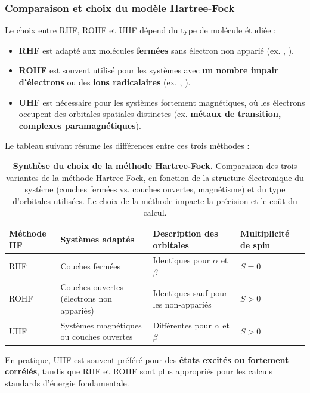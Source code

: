 \documentclass[12pt,a4paper]{article} %
\numberwithin{equation}{section} %
\numberwithin{figure}{section} %
\numberwithin{table}{section} %
\begin{document}
\subsubsection{Comparaison et choix du modèle Hartree-Fock}

Le choix entre RHF, ROHF et UHF dépend du type de molécule étudiée :
\begin{itemize}
    \item \textbf{RHF} est adapté aux molécules \textbf{fermées} sans électron non apparié (ex. , ).

    \item \textbf{ROHF} est souvent utilisé pour les systèmes avec \textbf{un nombre impair d’électrons} ou des \textbf{ions radicalaires} (ex. , ).

    \item \textbf{UHF} est nécessaire pour les systèmes fortement magnétiques, où les électrons occupent des orbitales spatiales distinctes (ex. \textbf{métaux de transition, complexes paramagnétiques}).
\end{itemize}

Le tableau suivant résume les différences entre ces trois méthodes :

\begin{table}[h!]
    \centering
    \begin{tabular}{|p{}|p{5cm}|p{5cm}|p{}|}
        \hline
        \textbf{Méthode HF} & \textbf{Systèmes adaptés} & \textbf{Description des orbitales} & \textbf{Multiplicité de spin} \\
        \hline
        RHF  & Couches fermées & Identiques pour $\alpha$ et $\beta$ & $S=0$ \\
        \hline
        ROHF & Couches ouvertes (électrons non appariés) & Identiques sauf pour les non-appariés & $S>0$ \\
        \hline
        UHF  & Systèmes magnétiques ou couches ouvertes & Différentes pour $\alpha$ et $\beta$ & $S>0$ \\
        \hline
    \end{tabular}
    \caption{\textbf{Synthèse du choix de la méthode Hartree-Fock.} Comparaison des trois variantes de la méthode Hartree-Fock, en fonction de la structure électronique du système (couches fermées vs. couches ouvertes, magnétisme) et du type d'orbitales utilisées. Le choix de la méthode impacte la précision et le coût du calcul.}
\end{table}

En pratique, UHF est souvent préféré pour des \textbf{états excités ou fortement corrélés}, tandis que RHF et ROHF sont plus appropriés pour les calculs standards d'énergie fondamentale.
\end{document}

